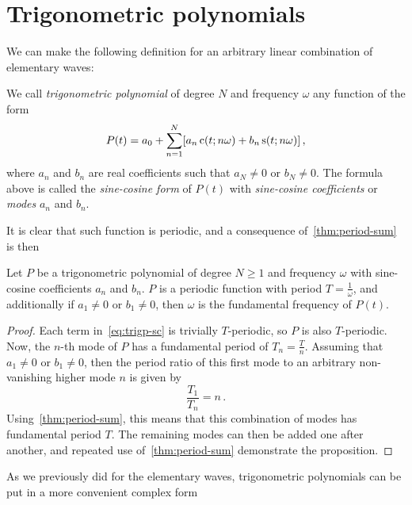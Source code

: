 \section{Trigonometric polynomials}
We can make the following definition for an arbitrary linear
combination of elementary waves:
\begin{definition}
  We call \emph{trigonometric polynomial} of degree $N$ and frequency $\omega$ any
  function of the form
  \begin{equation}
    P(t)=a_0+\sum_{n=1}^N[a_n\,\mathrm{c}(t;n\omega)+b_n\,\mathrm{s}(t;n\omega)]\,,
    \label{eq:trigp-sc}
  \end{equation}
  where $a_n$ and $b_n$ are real coefficients such that $a_N\neq 0$ or $b_N \neq 0$. The
  formula above is called the \emph{sine-cosine form} of $P(t)$ with \emph{sine-cosine
  coefficients} or \emph{modes} $a_n$ and $b_n$.
\end{definition}
It is clear that such function is periodic, and a consequence of~\cref{thm:period-sum} is
then
\begin{proposition}
  Let $P$ be a trigonometric polynomial of degree $N\geq 1$ and frequency $\omega$ with
  sine-cosine coefficients $a_n$ and $b_n$. $P$ is a periodic function with period
  $T=\frac{1}{\omega}$, and additionally if $a_1\neq0$ or $b_1\neq0$, then $\omega$ is the
  fundamental frequency of $P(t)$.
\end{proposition}
\begin{proof}
  Each term in~\cref{eq:trigp-sc} is trivially $T$-periodic, so $P$ is also $T$-periodic.
  Now, the $n$-th mode of $P$ has a fundamental period of $T_n=\frac{T}{n}$. Assuming that
  $a_1\neq0$ or $b_1\neq0$, then the period ratio of this first mode to an arbitrary
  non-vanishing higher mode $n$ is given by
  \begin{equation}
    \frac{T_1}{T_n}=n\,.
  \end{equation}
  Using~\cref{thm:period-sum}, this means that this combination of modes has fundamental
  period $T$. The remaining modes can then be added one after another, and repeated use
  of~\cref{thm:period-sum} demonstrate the proposition.
\end{proof}
As we previously did for the elementary waves, trigonometric polynomials can be put in a
more convenient complex form
